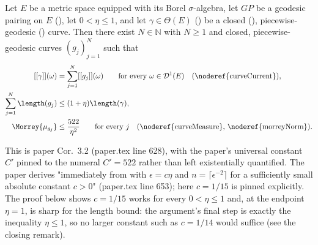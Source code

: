 \begin{corollary}
  \label{surgery-eta}
  Let $E$ be a metric space equipped with its Borel $\sigma$-algebra, let $GP$ be a geodesic
  pairing on $E$ (), let $0 < \eta \le 1$, and let $\gamma \in \Theta(E)$
  () be a closed (), piecewise-geodesic
  () curve. Then there exist $N \in \mathbb{N}$ with $N \ge 1$ and
  closed, piecewise-geodesic curves $(g_j)_{j=1}^N$ such that
  \begin{align}
    \label{eq:SurgeryEtaCurrent}
    [[\gamma]](\omega) &= \sum_{j=1}^N [[g_j]](\omega) \qquad \text{for every } \omega \in
    \mathcal{D}^1(E) \quad \text{(\noderef{curveCurrent})}, \\
    \label{eq:SurgeryEtaLength}
    \sum_{j=1}^N \length(g_j) &\le (1+\eta)\length(\gamma), \\
    \label{eq:SurgeryEtaMorrey}
    \Morrey{\mu_{g_j}} &\le \frac{522}{\eta^2} \qquad \text{for every } j
    \quad \text{(\noderef{curveMeasure}, \noderef{morreyNorm})}.
  \end{align}

  This is paper Cor.~3.2 (paper.tex line 628), with the paper's universal constant $C'$ pinned to
  the numeral $C'=522$ rather than left existentially quantified. The paper derives
   "immediately from  with $\epsilon=c\eta$ and
  $n=\lceil\epsilon^{-2}\rceil$ for a sufficiently small absolute constant $c>0$" (paper.tex line
  653); here $c=1/15$ is pinned explicitly. The proof below shows $c=1/15$ works for every
  $0<\eta\le1$ and, at the endpoint $\eta=1$, is sharp for the length bound: the argument's final
  step is exactly the inequality $\eta\le1$, so no larger constant such as $c=1/14$ would suffice
  (see the closing remark).
\end{corollary}
